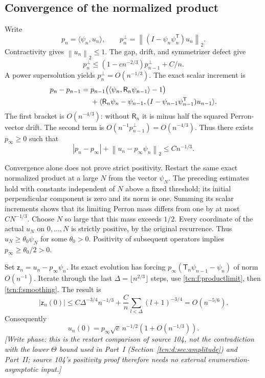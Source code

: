 \documentclass[11pt,letterpaper]{article}
\newcommand{\norm}[1]{\left\lVert#1\right\rVert}
\newcommand{\ip}[2]{\langle#1,#2\rangle}
\theoremstyle{remark}
\begin{document}
\subsection{Convergence of the normalized product}
Write
\[
 p_n=\ip{\psi_n}{u_n},\qquad
 p_n^\perp=\norm{(I-\psi_n\psi_n^{\mathsf T})u_n}_2.
\]
Contractivity gives $\norm{u_n}_2\le1$. The gap, drift, and symmetrizer defect give
\[
 p_n^\perp\le(1-cn^{-2/3})p_{n-1}^\perp+C/n.
\]
A power supersolution yields $p_n^\perp=O(n^{-1/3})$. The exact scalar increment is
\begin{align}
 p_n-p_{n-1}={}&p_{n-1}\bigl(\ip{\psi_n}{\mathsf R_n\psi_{n-1}}-1\bigr)\notag\\
 &+\ip{\mathsf R_n\psi_n-\psi_{n-1}}
 {(I-\psi_{n-1}\psi_{n-1}^{\mathsf T})u_{n-1}}.\label{tcn:f:scalarincrement}
\end{align}
The first bracket is $O(n^{-4/3})$: without $\mathsf R_n$ it is minus half the squared Perron-vector drift. The second term is $O(n^{-1}p_{n-1}^\perp)=O(n^{-4/3})$. Thus there exists $p_\infty\ge0$ such that
\begin{equation}\label{tcn:f:productlimit}
 |p_n-p_\infty|+\norm{u_n-p_\infty\psi_n}_2\le Cn^{-1/3}.
\end{equation}

Convergence alone does not prove strict positivity. Restart the same exact normalized product at a large $N$ from the vector $\psi_N$. The preceding estimates hold with constants independent of $N$ above a fixed threshold; its initial perpendicular component is zero and its norm is one. Summing its scalar increments shows that its limiting Perron mass differs from one by at most $CN^{-1/3}$. Choose $N$ so large that this mass exceeds $1/2$. Every coordinate of the actual $u_N$ on $0,\ldots,N$ is strictly positive, by the original recurrence. Thus $u_N\ge\theta_0\psi_N$ for some $\theta_0>0$. Positivity of subsequent operators implies $p_\infty\ge\theta_0/2>0$.

Set $\mathsf z_n=u_n-p_\infty\psi_n$. Its exact evolution has forcing $p_\infty(\mathsf T_n\psi_{n-1}-\psi_n)$ of norm $O(n^{-1})$. Iterate through the last $\Delta=\lfloor n^{2/3}\rfloor$ steps, use \eqref{tcn:f:productlimit}, then \eqref{tcn:f:smoothing}. The result is
\[
 |\mathsf z_n(0)|\le C\Delta^{-3/4}n^{-1/3}+\frac Cn\sum_{l<\Delta}(l+1)^{-3/4}
 =O(n^{-5/6}).
\]
Consequently
\begin{equation}\label{tcn:f:productendpoint}
 u_n(0)=p_\infty\sqrt c\,n^{-1/2}\left(1+O(n^{-1/3})\right).
\end{equation}
\emph{[Write phase: this is the restart comparison of source 104, not the contradiction with the lower $\Theta$ bound used in Part~I (Section~\ref{tcn:d:sec:amplitude}) and Part~II; source 104's positivity proof therefore needs no external enumeration-asymptotic input.]}
\end{document}
